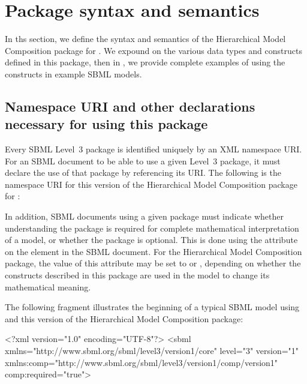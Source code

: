 
\newcommand{\fixttspace}{\hspace*{1pt}}

\section{Package syntax and semantics}
\label{sec:syntax}

In ths section, we define the syntax and semantics of the Hierarchical
Model Composition package for \sbmlthreecore.  We expound on the
various data types and constructs defined in this package, then in
, we provide complete examples of using the constructs in
example SBML models.

\subsection{Namespace URI and other declarations necessary for using this package}
\label{xml-namespace}

Every SBML Level~3 package is identified uniquely by an XML namespace
URI.  For an SBML document to be able to use a given Level~3
package, it must declare the use of that package by referencing its URI.
The following is the namespace URI for this version of the Hierarchical
Model Composition package for \sbmlthreecore:
\begin{center}
\end{center}

In addition, SBML documents using a given package must indicate whether
understanding the package is required for complete mathematical
interpretation of a model, or whether the package is optional.  This is
done using the attribute  on the  element
in the SBML document.  For the Hierarchical Model Composition package,
the value of this attribute may be set to  or ,
depending on whether the constructs described in this package are used
in the model to change its mathematical meaning.

The following fragment illustrates the beginning of a typical SBML model
using \sbmlthreecore and this version of the Hierarchical Model
Composition package:

\begin{example}
<?xml version="1.0" encoding="UTF-8"?>
<sbml xmlns="http://www.sbml.org/sbml/level3/version1/core" level="3" version="1"
      xmlns:comp="http://www.sbml.org/sbml/level3/version1/comp/version1" comp:required="true">
\end{example}
    

